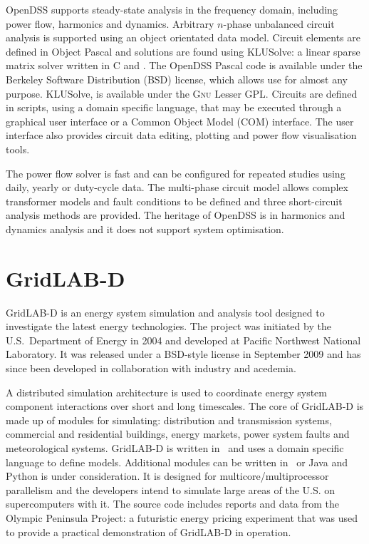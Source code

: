 OpenDSS supports steady-state analysis in the frequency domain, including power
flow, harmonics and dynamics.  Arbitrary $n$-phase unbalanced circuit analysis
is supported using an object orientated data model.  Circuit elements are
defined in Object Pascal and solutions are found using KLUSolve: a linear sparse
matrix solver written in C and \CC.  The OpenDSS Pascal code is available under
the Berkeley Software Distribution (BSD) license, which allows use for almost
any purpose.  KLUSolve, is available under the \textsc{Gnu} Lesser GPL.  Circuits are
defined in scripts, using a domain specific language, that may be executed
through a graphical user interface or a Common Object Model (COM) interface. The
user interface also provides circuit data editing, plotting and power flow
visualisation tools.

The power flow solver is fast and can be configured for repeated studies using
daily, yearly or duty-cycle data.  The multi-phase circuit model allows complex
transformer models and fault conditions to be defined and three short-circuit
analysis methods are provided.  The heritage of OpenDSS is in harmonics and
dynamics analysis and it does not support system optimisation.

\section{GridLAB-D}
GridLAB-D is an energy system simulation and analysis tool
designed to investigate the latest energy technologies.  The project was
initiated by the U.S.~Department of Energy in 2004 and developed at Pacific
Northwest National Laboratory.  It was released under a BSD-style license in
September 2009 and has since been developed in collaboration with industry and
acedemia.

A distributed simulation architecture is used to coordinate energy system
component interactions over short and long timescales.  The core of GridLAB-D is
made up of modules for simulating: distribution and transmission systems,
commercial and residential buildings, energy markets, power system faults and
meteorological systems.  GridLAB-D is written in \CC~and uses a domain specific
language to define models.  Additional modules can be written in \CC~or Java and
Python is under consideration.  It is designed for multicore/multiprocessor
parallelism and the developers intend to simulate large areas of the
U.S. on supercomputers with it.  The source code includes reports and data
from the Olympic Peninsula Project: a futuristic energy pricing experiment that was used
to provide a practical demonstration of GridLAB-D in operation.

